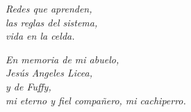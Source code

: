 \thispagestyle{empty}


{\raggedleft \itshape Redes que aprenden, \\
	las reglas del sistema, \\
	vida en la celda.\par}

\vspace{2cm}

{\raggedleft \itshape En memoria de mi abuelo,\\
Jesús Angeles Licea,\\[0.3cm]
y de Fuffy,\\
mi eterno y fiel compañero, mi cachiperro.\par}


\clearpage
